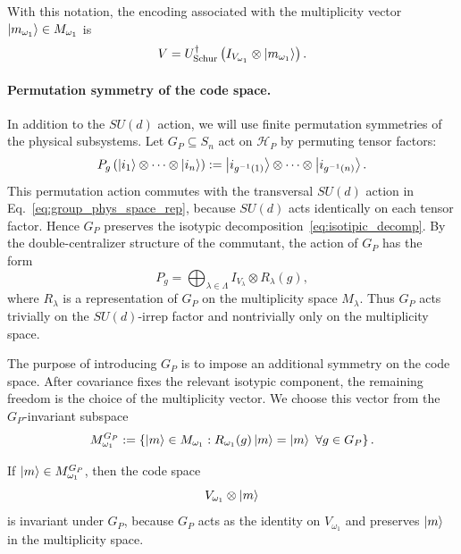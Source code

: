 \documentclass[10pt,twocolumn,superscriptaddress,aps,amsmath,amssymb,citeautoscript,floatfix,prx,longbibliography]{revtex4-2}
\theoremstyle{plain}
\theoremstyle{plain}
\theoremstyle{plain}
\theoremstyle{plain}
\theoremstyle{plain}
\theoremstyle{plain}
\begin{document}
With this notation, the encoding associated with the multiplicity vector $\ket{m_{\omega_1}}\in M_{\omega_1}$ is
\begin{equation}\label{eq:schur_transform_enc}
V
=
U_{\mathrm{Schur}}^\dagger
\left(
I_{V_{\omega_1}}
\otimes
\ket{m_{\omega_1}}
\right).
\end{equation}

\paragraph{Permutation symmetry of the code space.}

In addition to the $SU(d)$ action, we will use finite permutation symmetries of the physical subsystems. Let $G_P\subseteq S_n$ act on $\mathcal H_P$ by permuting tensor factors:
\begin{equation}\label{eq:group_act_on_phys_space}
P_g
\left(
\ket{i_1}\otimes\cdots\otimes\ket{i_n}
\right)
:=
\ket{i_{g^{-1}(1)}}\otimes\cdots\otimes\ket{i_{g^{-1}(n)}} .
\end{equation}
This permutation action commutes with the transversal $SU(d)$ action in Eq.~\eqref{eq:group_phys_space_rep}, because $SU(d)$ acts identically on each tensor factor. Hence $G_P$ preserves the isotypic decomposition~\eqref{eq:isotipic_decomp}. By the double-centralizer structure of the commutant, the action of $G_P$ has the form~\cite{GoodmanWallach2009}
\begin{equation}\label{eq:group_act_on_code}
P_g
=
\bigoplus_{\lambda\in\Lambda}
I_{V_\lambda}\otimes R_\lambda(g),
\end{equation}
where $R_\lambda$ is a representation of $G_P$ on the multiplicity space $M_\lambda$. Thus $G_P$ acts trivially on the $SU(d)$-irrep factor and nontrivially only on the multiplicity space.

The purpose of introducing $G_P$ is to impose an additional symmetry on the code space. After covariance fixes the relevant isotypic component, the remaining freedom is the choice of the multiplicity vector. We choose this vector from the $G_P$-invariant subspace
\begin{equation}\label{eq:g_inv_subspace}
M_{\omega_1}^{G_P}
:=
\left\{
\ket m\in M_{\omega_1}
:
R_{\omega_1}(g)\ket m=\ket m
\ \forall g\in G_P
\right\}.
\end{equation}

If $\ket m\in M_{\omega_1}^{G_P}$, then the code space
$$
V_{\omega_1}\otimes\ket m
$$
is invariant under $G_P$, because $G_P$ acts as the identity on $V_{\omega_1}$ and preserves $\ket m$ in the multiplicity space.
\end{document}
